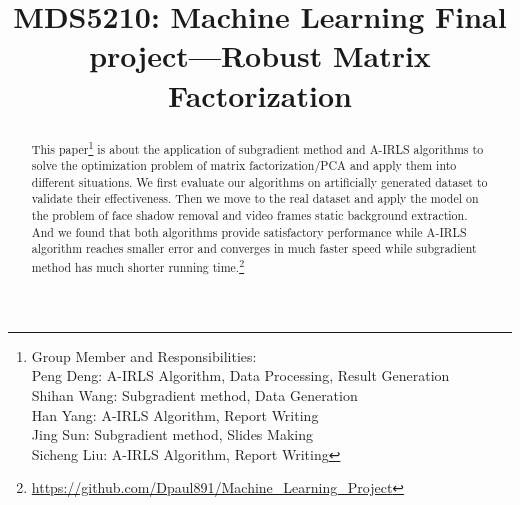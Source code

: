 \documentclass[conference]{IEEEtran}
\begin{document}
\title{MDS5210: Machine Learning Final project—Robust Matrix Factorization
\\

}

\author{
\and
{}
\and
{}
\and
{}
\and
{}
\and
}

\maketitle
\thispagestyle{fancy}
\cfoot{\thepage}
\renewcommand{\thefootnote}{\fnsymbol{footnote}}
\begin{abstract}
This paper\footnote[1]{
	Group Member and Responsibilities:\\
	Peng Deng: A-IRLS Algorithm, Data Processing, Result Generation\\
	Shihan Wang: Subgradient method, Data Generation\\
	Han Yang: A-IRLS Algorithm, Report Writing\\
	Jing Sun: Subgradient method, Slides Making\\
	Sicheng Liu: A-IRLS Algorithm, Report Writing} is about the application of subgradient method and A-IRLS algorithms to solve the optimization problem of matrix factorization/PCA and apply them into different situations. 
We first evaluate our algorithms on artificially generated dataset to validate their effectiveness. Then we move to the real dataset and apply the model on the problem of face shadow removal and video frames static background extraction. And we found that both algorithms provide satisfactory performance while A-IRLS algorithm reaches smaller error and converges in much faster speed while subgradient method has much shorter running time.\footnote[2]{\url{https://github.com/Dpaul891/Machine_Learning_Project}}



\end{abstract}
\end{document}
